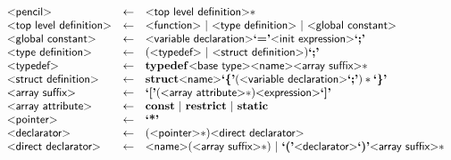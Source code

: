 \newcommand{\pgrammar}[1]{\text{\sf\textless#1\textgreater}}
\newcommand{\pkeyword}[1]{\mathbf{#1}}
\newcommand{\plexer}[1]{\text{\bf`#1'}}

\begin{figure}
\[
\begin{array}{lcl}
  \pgrammar{pencil} & \gets &  \pgrammar{top level definition}*\\
  \pgrammar{top level definition} & \gets & \pgrammar{function}
                                          ~|~\pgrammar{type definition}
                                          ~|~\pgrammar{global constant}\\

  \pgrammar{global constant} & \gets & \pgrammar{variable declaration}
                                       \plexer{=}
                                       \pgrammar{init expression} \plexer{;}\\

  \pgrammar{type definition} & \gets & (\pgrammar{typedef}
                                     ~|~ \pgrammar{struct definition}) \plexer{;}\\

  \pgrammar{typedef} & \gets & \pkeyword{typedef} \pgrammar{base type} \pgrammar{name} \pgrammar{array suffix}*\\

  \pgrammar{struct definition} & \gets & \pkeyword{struct} \pgrammar{name}
                                         \plexer{\{}
                                           (\pgrammar{variable declaration} \plexer{;})*
                                         \plexer{\}}\\

  \pgrammar{array suffix} & \gets & \plexer{[}
                                     (\pgrammar{array attribute}*) \pgrammar{expression}
                                    \plexer{]}\\

  \pgrammar{array attribute} & \gets & \pkeyword{const} ~|~ \pkeyword{restrict} ~|~ \pkeyword{static}\\

  \pgrammar{pointer} & \gets &  \plexer{*}\\

  \pgrammar{declarator} & \gets & (\pgrammar{pointer}*) \pgrammar{direct declarator}\\

  \pgrammar{direct declarator} & \gets & \pgrammar{name} (\pgrammar{array suffix}*)
                                       ~|~ \plexer{(} \pgrammar{declarator} \plexer{)} \pgrammar{array suffix}*\\


\end{array}\]
\end{figure}
